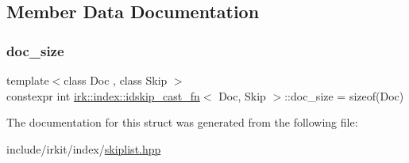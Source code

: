 \subsection{Member Data Documentation}
\mbox{\label{structirk_1_1index_1_1idskip__cast__fn_af5ddc933343dae09e7b2a74e87880f8f}} 
\subsubsection{\texorpdfstring{doc\+\_\+size}{doc\_size}}
{\footnotesize\ttfamily template$<$class Doc , class Skip $>$ \\
constexpr int \mbox{\hyperlink{structirk_1_1index_1_1idskip__cast__fn}{irk\+::index\+::idskip\+\_\+cast\+\_\+fn}}$<$ Doc, Skip $>$\+::doc\+\_\+size = sizeof(Doc)\hspace{0.3cm}{\ttfamily [static]}}



The documentation for this struct was generated from the following file\+:\begin{DoxyCompactItemize}
\item 
include/irkit/index/\mbox{\hyperlink{skiplist_8hpp}{skiplist.\+hpp}}\end{DoxyCompactItemize}
